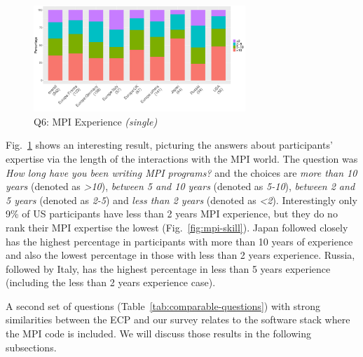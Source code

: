 \documentclass[preprint,5p,times]{elsarticle}
\def\myquote#1{{\it #1}}
\begin{document}
\begin{figure}[htb]
  \begin{center}
    \includegraphics[width=8.0cm]{R-scripts/Q6.pdf}
    \vspace{-2mm}
    \caption{Q6: MPI Experience {\it(single)}}
    \label{fig:mpi-experience}
  \end{center}
\end{figure}

Fig.~\ref{fig:mpi-experience} shows an interesting result, picturing the answers
about participants' expertise via the length of the interactions with the MPI
world. The question was {\it How long have you been writing MPI programs?} and
the choices are {\it more than 10 years} (denoted as \myquote{\textgreater 10}),
\myquote{between 5 and 10 years} (denoted as \myquote{5-10}), \myquote{between 2
and 5 years} (denoted as \myquote{2-5}) and \myquote{less than 2 years} (denoted
as \myquote{\textless 2}). Interestingly only 9\% of US participants have less
than 2 years MPI experience, but they do no rank their MPI expertise the lowest
(Fig.~\ref {fig:mpi-skill}). Japan followed closely has the highest percentage
in participants with more than 10 years of experience and also the lowest
percentage in those with less than 2 years experience. Russia, followed by
Italy, has the highest percentage in less than 5 years experience (including the
less than 2 years experience case).

A second set of questions (Table~\ref{tab:comparable-questions}) with strong
similarities between the ECP and our survey relates to the software stack where
the MPI code is included. We will discuss those results in the following
subsections.
\end{document}

